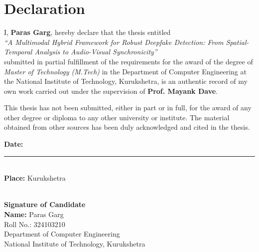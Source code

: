 \chapter*{Declaration}
\thispagestyle{empty}
I, \textbf{Paras Garg}, hereby declare that the thesis entitled\\
\textit{``A Multimodal Hybrid Framework for Robust Deepfake Detection: From Spatial-Temporal Analysis to Audio-Visual Synchronicity''}\\
submitted in partial fulfillment of the requirements for the award of the degree of \textit{Master of Technology (M.Tech)} in the Department of Computer Engineering at the National Institute of Technology, Kurukshetra, is an authentic record of my own work carried out under the supervision of \textbf{Prof. Mayank Dave}.

This thesis has not been submitted, either in part or in full, for the award of any other degree or diploma to any other university or institute. The material obtained from other sources has been duly acknowledged and cited in the thesis.

\vspace{1.5cm}
\noindent
\begin{minipage}[t]{0.55\textwidth}
\textbf{Date:} \rule{3.5cm}{0.2pt}\\[0.6cm]
\textbf{Place:} Kurukshetra
\end{minipage}
\hfill
\begin{minipage}[t]{0.4\textwidth}
\makebox[0.9\linewidth]{\hrulefill}\\
\textbf{Signature of Candidate}\\
\textbf{Name:} Paras Garg\\
Roll No.: 324103210\\
Department of Computer Engineering\\
National Institute of Technology, Kurukshetra
\end{minipage}

\clearpage
